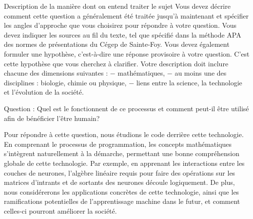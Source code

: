 Description de la manière dont on entend traiter le sujet
Vous devez décrire comment cette question a généralement été traitée jusqu’à maintenant et spécifier les
angles d’approche que vous choisirez pour répondre à votre question. Vous devez indiquer les sources au
fil du texte, tel que spécifié dans la méthode APA des normes de présentations du Cégep de Sainte-Foy.
Vous devez également formuler une hypothèse, c’est-à-dire une réponse provisoire à votre question. C’est
cette hypothèse que vous cherchez à clarifier.
Votre description doit inclure chacune des dimensions suivantes :
− mathématiques,
− au moins une des disciplines : biologie, chimie ou physique,
− liens entre la science, la technologie et l’évolution de la société.

Question : Quel est le fonctionnent de ce processus et comment peut-il être utilisé afin de bénéficier l’être humain?

Pour répondre à cette question, nous étudions le code derrière cette technologie. 
En comprenant le processus de programmation, les concepts mathématiques s'intègrent naturellement à
la démarche, permettant une bonne compréhension globale de cette technologie. Par exemple, en apprenant les interactions
entre les couches de neurones, l'algèbre linéaire requis pour faire des opérations sur les matrices d'intrants et de sortants
des neurones découle logiquement. De plus, nous considérerons les applications concrètes de cette technologie, ainsi que les
ramifications potentielles de l'apprentissage machine dans le futur, et comment celles-ci pourront améliorer la société.
